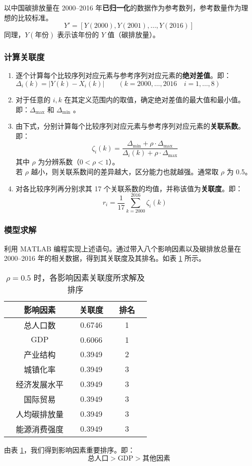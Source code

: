       以中国碳排放量在 2000--2016 年\textbf{已归一化}的数据作为参考数列，参考数量作为理想的比较标准。
      \[
        Y' = [Y(2000),Y(2001),\ldots,Y(2016)]
      \]
      同理，$Y(\text{年份})$ 表示该年份的 $Y$ 值（碳排放量）。

    \subsubsection{计算关联度}
      \begin{enumerate}
        \item 逐个计算每个比较序列对应元素与参考序列对应元素的\textbf{绝对差值}。即：$\Delta_i(k)=|Y(k)-X_i(k)|\qquad (k=2000,\dots,2016\quad i=1,\dots,8)$
        \item 对于任意的 $i,k$ 在其定义范围内的取值，确定绝对差值的最大值和最小值。即：$\Delta_\text{max}$ 和 $\Delta_\text{min}$ 。
        \item 由下式，分别计算每个比较序列对应元素与参考序列对应元素的\textbf{关联系数}。即：
          \[
            \zeta_i(k)=\frac{\Delta_\text{min}+\rho\cdot\Delta_\text{max}}{\Delta_i(k)+\rho\cdot\Delta_\text{max}}
          \]
          其中 $\rho$ 为分辨系数（$0<\rho<1$）。\\
          若 $\rho$ 越小，则关联系数间的差异越大，区分能力也就越强。通常取 $\rho$ 为 0.5。
        \item 对各比较序列再分别求其 17 个关联系数的均值，并称该值为\textbf{关联度}\cite{de2013}。即：
          \[
            r_i=\frac{1}{17}\sum_{k=2000}^{2016} \zeta_i(k)
          \]
      \end{enumerate}

    \subsubsection{模型求解}
      利用 $\mathrm{MATLAB}$ 编程实现上述语句。通过带入八个影响因素以及碳排放总量在 2000--2016 年的相关数据，得到其关联度及其排名。如表 \ref{tab:guanlianxu0.5} 所示。
      \begin{table}[htb]
        \centering
        \caption{$\rho=0.5$ 时，各影响因素关联度所求解及排序}
        \begin{tabular*}{0.618\paperwidth}{@{\extracolsep{\fill}}ccccccc}
          \toprule[1.5pt]
          &影响因素 && 关联度 && 排名 &\\
          \midrule[1pt]
          &总人口数 && 0.6746 && 1 &\\
          &$\mathrm{GDP}$ && 0.6066 && 1 &\\
          &产业结构 && 0.3949 && 2 &\\
          &城镇化率 && 0.3949 && 3 &\\
          &经济发展水平 && 0.3949 && 3 &\\
          &国际贸易 && 0.3949 && 3 &\\
          &人均碳排放量 && 0.3949 && 3 &\\
          &能源消费强度 && 0.3949 && 3 &\\
          \bottomrule[1.5pt]
        \end{tabular*}
        \label{tab:guanlianxu0.5}
      \end{table}

      由表 \ref{tab:guanlianxu0.5}，我们得到影响因素重要排序。即：
      \[
        \text{总人口}>\textrm{GDP}>\text{其他因素}
      \]